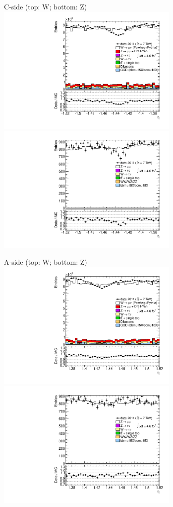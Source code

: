 {

\colb[T]

C-side (top: W; bottom: Z)
\centering
\includegraphics[width=0.66\textwidth]{dates/20130306/figures/etaphi/W_7_C_stack_l_eta_POS} \\
\includegraphics[width=0.66\textwidth]{dates/20130306/figures/etaphi/Z_7_C_stack_lP_eta_ALL.pdf}

A-side (top: W; bottom: Z)
\centering
\includegraphics[width=0.66\textwidth]{dates/20130306/figures/etaphi/W_7_A_stack_l_eta_POS} \\
\includegraphics[width=0.66\textwidth]{dates/20130306/figures/etaphi/Z_7_A_stack_lP_eta_ALL.pdf} 

\cole
}


